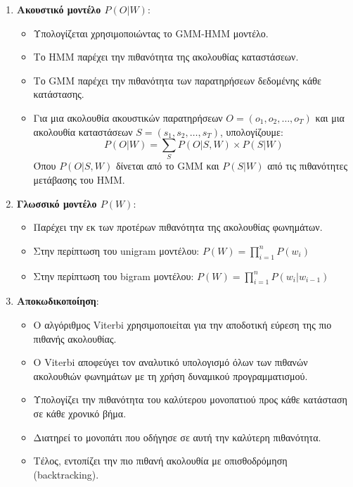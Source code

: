 \documentclass[a4paper,12pt]{article}
\begin{document}
\begin{enumerate}
    \item \textbf{Ακουστικό μοντέλο $P(O|W)$}:
    \begin{itemize}
        \item Υπολογίζεται χρησιμοποιώντας το GMM-HMM μοντέλο.
        \item Το HMM παρέχει την πιθανότητα της ακολουθίας καταστάσεων.
        \item Το GMM παρέχει την πιθανότητα των παρατηρήσεων δεδομένης κάθε κατάστασης.
        \item Για μια ακολουθία ακουστικών παρατηρήσεων $O = (o_1, o_2, \ldots, o_T)$ και μια ακολουθία καταστάσεων $S = (s_1, s_2, \ldots, s_T)$, υπολογίζουμε:
        \begin{equation}
        P(O|W) = \sum_{S} P(O|S,W) \times P(S|W)
        \end{equation}
        Όπου $P(O|S,W)$ δίνεται από το GMM και $P(S|W)$ από τις πιθανότητες μετάβασης του HMM.
    \end{itemize}
    
    \item \textbf{Γλωσσικό μοντέλο $P(W)$}:
    \begin{itemize}
        \item Παρέχει την εκ των προτέρων πιθανότητα της ακολουθίας φωνημάτων.
        \item Στην περίπτωση του unigram μοντέλου: $P(W) = \prod_{i=1}^{n} P(w_i)$
        \item Στην περίπτωση του bigram μοντέλου: $P(W) = \prod_{i=1}^{n} P(w_i|w_{i-1})$
    \end{itemize}
    
    \item \textbf{Αποκωδικοποίηση}:
    \begin{itemize}
        \item Ο αλγόριθμος Viterbi χρησιμοποιείται για την αποδοτική εύρεση της πιο πιθανής ακολουθίας.
        \item Ο Viterbi αποφεύγει τον αναλυτικό υπολογισμό όλων των πιθανών ακολουθιών φωνημάτων με τη χρήση δυναμικού προγραμματισμού.
        \item Υπολογίζει την πιθανότητα του καλύτερου μονοπατιού προς κάθε κατάσταση σε κάθε χρονικό βήμα.
        \item Διατηρεί το μονοπάτι που οδήγησε σε αυτή την καλύτερη πιθανότητα.
        \item Τέλος, εντοπίζει την πιο πιθανή ακολουθία με οπισθοδρόμηση (backtracking).
    \end{itemize}
\end{enumerate}
\end{document}
